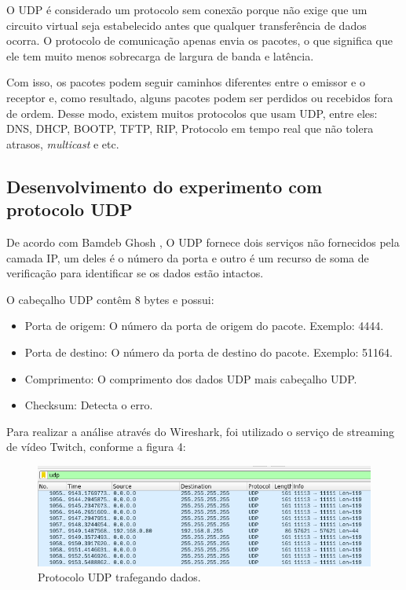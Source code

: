 \documentclass[12pt]{article}
\begin{document}
O UDP é considerado um protocolo sem conexão porque não exige que um circuito virtual seja estabelecido antes que qualquer transferência de dados ocorra. O protocolo de comunicação apenas envia os pacotes, o que significa que ele tem muito menos sobrecarga de largura de banda e latência.

Com isso, os pacotes podem seguir caminhos diferentes entre o emissor e o receptor e, como resultado, alguns pacotes podem ser perdidos ou recebidos fora de ordem. Desse modo, existem muitos protocolos que usam UDP, entre eles: DNS, DHCP, BOOTP, TFTP, RIP, Protocolo em tempo real que não tolera atrasos, \emph{multicast} e etc.

\subsection{Desenvolvimento do experimento com protocolo UDP}
De acordo com Bamdeb Ghosh \cite{linuxhint}, O UDP fornece dois serviços não fornecidos pela camada IP, um deles é o número da porta e outro é um recurso de soma de verificação para identificar se os dados estão intactos.

O cabeçalho UDP contêm 8 bytes e possui:
 \begin{itemize}
   \item Porta de origem: O número da porta de origem do pacote. Exemplo: 4444.
   \item Porta de destino: O número da porta de destino do pacote. Exemplo: 51164.
   \item Comprimento: O comprimento dos dados UDP mais cabeçalho UDP.
   \item Checksum: Detecta o erro. 
 \end{itemize}

Para realizar a análise através do Wireshark, foi utilizado o serviço de streaming de vídeo Twitch, conforme a figura 4:

\begin{figure}[H]
    \centering
    \includegraphics[width=\linewidth]{udp.png}
    \caption{Protocolo UDP trafegando dados.}
\end{figure}
\end{document}
